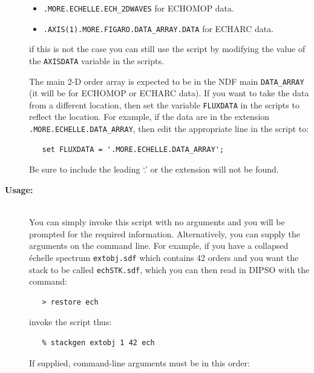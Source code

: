 \documentclass[twoside,11pt]{article}
\renewcommand{\_}{\texttt{\symbol{95}}}
\begin{document}
\begin{description}
\begin{itemize}

\item \verb+.MORE.ECHELLE.ECH_2DWAVES+ for ECHOMOP data.

\item \verb+.AXIS(1).MORE.FIGARO.DATA_ARRAY.DATA+ for ECHARC data.

\end{itemize}

     if this is not the case you can still use the script by modifying
     the value of the \verb+AXISDATA+ variable in the scripts.

     The main 2-D order array is expected to be in the NDF main
     \verb+DATA_ARRAY+ (it will be for ECHOMOP or ECHARC data).
     If you want to take the data from a different location, then
     set the variable \verb+FLUXDATA+ in the scripts to reflect
     the location.  For example, if the data are in the extension
     \verb+.MORE.ECHELLE.DATA_ARRAY+, then edit the appropriate line
     in the script to:

\begin{verbatim}
   set FLUXDATA = '.MORE.ECHELLE.DATA_ARRAY';
\end{verbatim}

     Be sure to include the leading `.' or the extension will not be
     found.

\item [{\bf Usage:}] \mbox{} \\
     You can simply invoke this script with no arguments and you
     will be prompted for the required information.  Alternatively,
     you can supply the arguments on the command line.  For example,
     if you have a collapsed \'{e}chelle spectrum \verb+extobj.sdf+ which
     contains 42 orders and you want the stack to be called
     {\tt ech\_STK.sdf}, which you can then read in DIPSO with the
     command:

\begin{verbatim}
   > restore ech
\end{verbatim}

     invoke the script thus:

\begin{verbatim}
   % stackgen extobj 1 42 ech
\end{verbatim}

     If supplied, command-line arguments must be in this order:

\begin{enumerate}


\end{enumerate}
\end{description}
\end{document}
